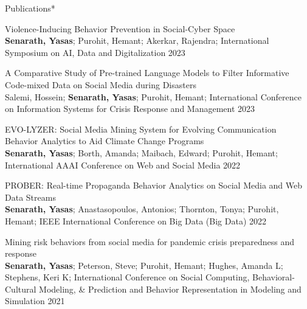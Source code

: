 \documentclass{resume} %
\begin{document}
\begin{rSection}{Publications*}
    \begin{rSubsection}{ Violence-Inducing Behavior Prevention in Social-Cyber Space }{\\ \textbf{Senarath, Yasas}; Purohit, Hemant; Akerkar, Rajendra; }{International Symposium on AI, Data and Digitalization}{ 2023 }
    \end{rSubsection}

    \begin{rSubsection}{ A Comparative Study of Pre-trained Language Models to Filter Informative Code-mixed Data on Social Media during Disasters }{\\ Salemi, Hossein; \textbf{Senarath, Yasas}; Purohit, Hemant; }{International Conference on Information Systems for Crisis Response and Management}{ 2023 }
    \end{rSubsection}

    \begin{rSubsection}{ EVO-LYZER: Social Media Mining System for Evolving Communication Behavior Analytics to Aid Climate Change Programs }{\\ \textbf{Senarath, Yasas}; Borth, Amanda; Maibach, Edward; Purohit, Hemant; }{International AAAI Conference on Web and Social Media}{ 2022 }
    \end{rSubsection}

    \begin{rSubsection}{ PROBER: Real-time Propaganda Behavior Analytics on Social Media and Web Data Streams }{\\ \textbf{Senarath, Yasas}; Anastasopoulos, Antonios; Thornton, Tonya; Purohit, Hemant; }{IEEE International Conference on Big Data (Big Data)}{ 2022 }
    \end{rSubsection}


    \begin{rSubsection}{ Mining risk behaviors from social media for pandemic crisis preparedness and response }{\\ \textbf{Senarath, Yasas}; Peterson, Steve; Purohit, Hemant; Hughes, Amanda L; Stephens, Keri K; }{International Conference on Social Computing, Behavioral-Cultural Modeling, \& Prediction and Behavior Representation in Modeling and Simulation}{ 2021 }
    \end{rSubsection}


\end{rSection}
\end{document}
